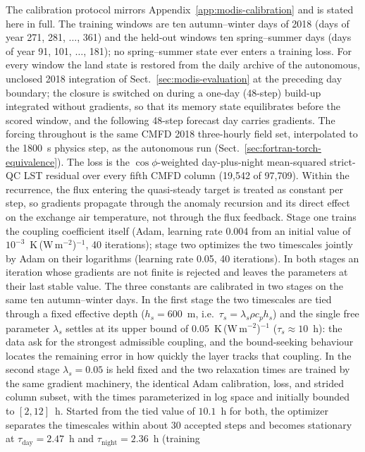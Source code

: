 The calibration protocol mirrors Appendix~\ref{app:modis-calibration} and
is stated here in full. The training windows are ten autumn--winter days of
2018 (days of year 271, 281, $\dots$, 361) and the held-out windows ten
spring--summer days (days of year 91, 101, $\dots$, 181); no
spring--summer state ever enters a training loss. For every window the land
state is restored from the daily archive of the autonomous, unclosed 2018
integration of Sect.~\ref{sec:modis-evaluation} at the preceding day
boundary; the closure is switched on during a one-day (48-step) build-up
integrated without gradients, so that its memory state equilibrates before
the scored window, and the following 48-step forecast day carries
gradients. The forcing throughout is the same CMFD 2018 three-hourly
field set, interpolated to the 1800~s physics step, as the autonomous run
(Sect.~\ref{sec:fortran-torch-equivalence}). The loss is the
$\cos\phi$-weighted day-plus-night mean-squared strict-QC LST residual over
every fifth CMFD column (19{,}542 of 97{,}709). Within the recurrence, the
flux entering the quasi-steady target is treated as constant per step, so
gradients propagate through the anomaly recursion and its direct effect on
the exchange air temperature, not through the flux feedback. Stage one
trains the coupling coefficient itself (Adam, learning rate 0.004 from an
initial value of $10^{-3}$~K\,(W\,m$^{-2}$)$^{-1}$, 40 iterations); stage
two optimizes the two timescales jointly by Adam on their logarithms
(learning rate 0.05, 40 iterations). In both stages an
iteration whose gradients are not finite is rejected and leaves the
parameters at their last stable value. The
three constants are calibrated
in two stages on the same ten autumn--winter days. In the first stage the
two timescales are tied through a fixed effective depth ($h_s = 600$~m,
i.e.\ $\tau_s = \lambda_s \rho c_p h_s$) and the single free parameter
$\lambda_s$ settles at its upper bound of
$0.05$~K\,(W\,m$^{-2}$)$^{-1}$ ($\tau_s \approx 10$~h): the data ask for the
strongest admissible coupling, and the bound-seeking behaviour locates the
remaining error in how quickly the layer tracks that coupling. In the
second stage $\lambda_s = 0.05$ is held fixed and the two relaxation times
are trained by the same gradient machinery, the identical Adam
calibration, loss, and strided column subset, with the times
parameterized in log space and initially bounded to $[2,12]$~h. Started
from the tied value of $10.1$~h for both, the optimizer separates the
timescales within about 30 accepted steps and becomes stationary at
$\tau_{\mathrm{day}} = 2.47$~h and $\tau_{\mathrm{night}} = 2.36$~h (training
